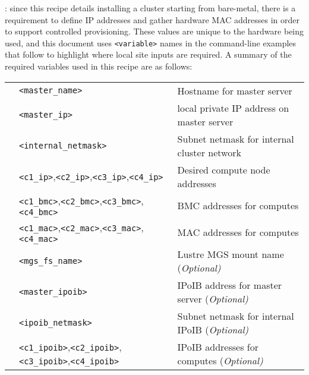 : since this recipe details installing a cluster
starting from bare-metal, there is a requirement to define IP addresses and gather
hardware MAC addresses in order to support controlled provisioning. These values
are unique to the hardware being used, and this document uses \texttt{<variable>}
names in the command-line examples that follow to highlight where local site
inputs are required. A summary of the required variables used in this recipe
are as follows: \\

\vspace*{0.2cm}
\begin{tabular}{@{}>{\textbullet}cll@{}}
& \texttt{<master\_name>}  & Hostname for master server \\
& \texttt{<master\_ip>} & local private IP address on master server \\
& \texttt{<internal\_netmask>} & Subnet netmask for internal cluster network \\
& \texttt{<c1\_ip>},\texttt{<c2\_ip>},\texttt{<c3\_ip>},\texttt{<c4\_ip>}
& Desired compute node addresses \\
& \texttt{<c1\_bmc>},\texttt{<c2\_bmc>},\texttt{<c3\_bmc>},\texttt{<c4\_bmc>}
& BMC addresses for computes \\
& \texttt{<c1\_mac>},\texttt{<c2\_mac>},\texttt{<c3\_mac>},\texttt{<c4\_mac>}
& MAC addresses for computes \\
& \texttt{<mgs\_fs\_name>} & Lustre MGS mount name (\em Optional)\\
& \texttt{<master\_ipoib>} & IPoIB address for master server (\em Optional) \\
& \texttt{<ipoib\_netmask>} & Subnet netmask for internal IPoIB (\em Optional) \\
& \texttt{<c1\_ipoib>},\texttt{<c2\_ipoib>},\texttt{<c3\_ipoib>},\texttt{<c4\_ipoib>}
& IPoIB addresses for computes (\em Optional)\\

\end{tabular}
